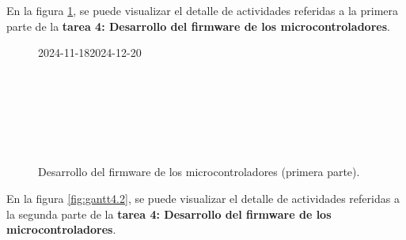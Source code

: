En la figura \ref{fig:gantt4.1}, se puede visualizar el detalle de actividades referidas a la primera parte
de la \textbf{tarea 4: Desarrollo del firmware de los microcontroladores}.

\begin{figure}[H]
		\begin{ganttchart}[
				time slot unit=day,
				time slot format=isodate,
				x unit=0.33cm, %
				y unit title=0.7cm, %
				y unit chart=0.7cm, %
				milestone/.append style={xscale=4},
				vgrid,
				hgrid,
			]{2024-11-18}{2024-12-20}
			 \\
			 \\
			 \\
			 \\
			 \\
			 \\
			 \\
		\end{ganttchart}
	\caption{Desarrollo del firmware de los microcontroladores (primera parte).}
	\label{fig:gantt4.1}
\end{figure}

En la figura \ref{fig:gantt4.2}, se puede visualizar el detalle de actividades referidas a la segunda parte
de la \textbf{tarea 4: Desarrollo del firmware de los microcontroladores}.

